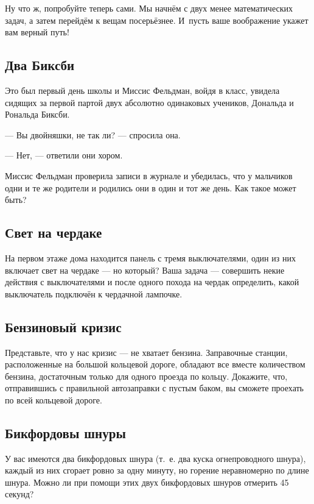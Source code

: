 \medskip

Ну что ж, попробуйте теперь сами.
Мы начнём с двух менее математических задач, а затем перейдём к вещам посерьёзнее.
И~пусть ваше воображение укажет вам верный путь!

\subsection*{Два Биксби} %

Это был первый день школы и Миссис Фельдман, войдя в класс, увидела сидящих за первой партой двух абсолютно одинаковых учеников, Дональда и Рональда Биксби.

--- Вы двойняшки, не так ли? --- спросила она.

--- Нет, --- ответили они хором.

Миссис Фельдман проверила записи в журнале и убедилась, что у мальчиков одни и те же родители и родились они в один и тот же день.
Как такое может быть?

\subsection*{Свет на чердаке} %

На первом этаже дома находится панель с тремя выключателями, один из них включает свет на чердаке --- но который? 
Ваша задача --- совершить некие действия с выключателями и после одного похода на чердак определить, какой выключатель подключён к чердачной лампочке.

\subsection*{Бензиновый кризис} %

Представьте, что у нас кризис --- не хватает бензина.
Заправочные станции, расположенные на большой кольцевой дороге, обладают все вместе количеством бензина, достаточным только для одного проезда по кольцу.
Докажите, что, отправившись с правильной автозаправки с пустым баком, вы сможете проехать по всей кольцевой дороге.

\subsection*{Бикфордовы шнуры} %

У вас имеются два бикфордовых шнура (т.~е. два куска огнепроводного шнура), каждый из них сгорает ровно за одну минуту, но горение неравномерно по длине шнура.
Можно ли при помощи этих двух бикфордовых шнуров отмерить 45 секунд?


